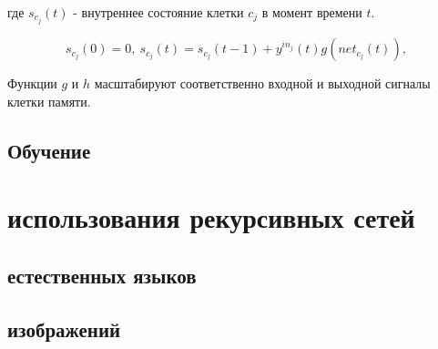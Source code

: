 \documentclass[14pt]{article}
\begin{document}
где $s_{c_j}(t)$ - внутреннее состояние клетки $c_j$ в момент времени $t$.

\begin{equation}
s_{c_j}(0) = 0,~s_{c_j}(t) = s_{c_j}(t - 1) + y^{in_j}(t)g(net_{c_j}(t)),\nonumber
\end{equation}

Функции $g$ и $h$ масштабируют соответственно входной и выходной сигналы клетки памяти.

\subsection{Обучение}


\section{ использования рекурсивных сетей}

\subsection{ естественных языков}

\subsection{ изображений}


\section{}
\end{document}
